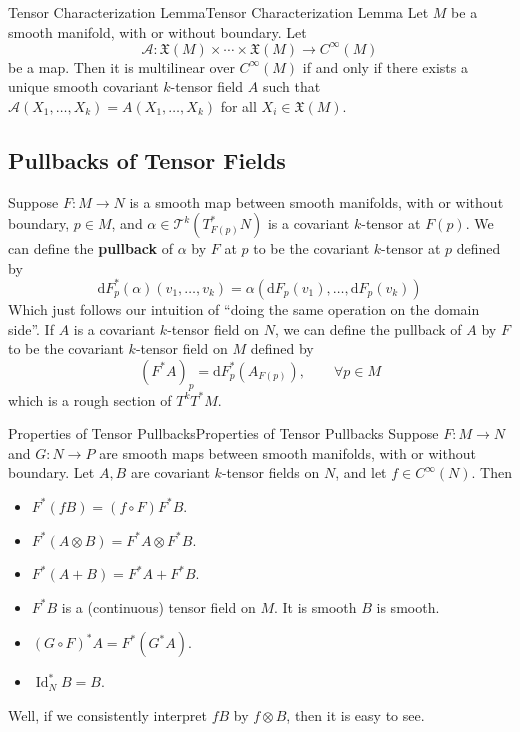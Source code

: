\documentclass[../main.tex]{subfiles}
\begin{document}
\begin{lemma}{Tensor Characterization Lemma}{Tensor Characterization Lemma}
  Let $M$ be a smooth manifold, with or without boundary. Let
  \begin{equation*}
    \mathcal{A}: \mathfrak{X}(M) \times \cdots \times \mathfrak{X}(M) \to C^\infty(M)
  \end{equation*}
  be a map. Then it is multilinear over $C^\infty(M)$ if and only if there exists a unique smooth covariant $k$-tensor field $A$ such that $\mathcal{A}(X_1, \ldots, X_k) = A(X_1, \ldots, X_k)$ for all $X_i \in \mathfrak{X}(M)$.
\end{lemma}

\subsection{Pullbacks of Tensor Fields}
Suppose $F: M \to N$ is a smooth map between smooth manifolds, with or without boundary, $p\in M$, and $\alpha\in \mathcal{T}^k(T^*_{F(p)} N)$ is a covariant $k$-tensor at $F(p)$. We can define the \textbf{pullback} of $\alpha$ by $F$ at $p$ to be the covariant $k$-tensor at $p$ defined by
\begin{equation}
  \mathrm{d} F_p^* (\alpha)(v_1, \ldots, v_k) = \alpha(\mathrm{d} F_p(v_1), \ldots, \mathrm{d} F_p(v_k))
\end{equation}
Which just follows our intuition of ``doing the same operation on the domain side''. If $A$ is a covariant $k$-tensor field on $N$, we can define the pullback of $A$ by $F$ to be the covariant $k$-tensor field on $M$ defined by
\begin{equation}
  (F^* A)_p = \mathrm{d} F_p^* (A_{F(p)}), \qquad \forall p\in M
\end{equation}
which is a rough section of $T^k T^* M$.

\begin{proposition}{Properties of Tensor Pullbacks}{Properties of Tensor Pullbacks}
  Suppose $F: M \to N$ and $G: N \to P$ are smooth maps between smooth manifolds, with or without boundary. Let $A, B$ are covariant $k$-tensor fields on $N$, and let $f\in C^\infty(N)$. Then
  \begin{itemize}
    \item $F^* (fB) = (f\circ F) F^* B$.
    \item $F^* (A \otimes B) = F^* A \otimes F^* B$.
    \item $F^* (A + B) = F^* A + F^* B$.
    \item $F^* B$ is a (continuous) tensor field on $M$. It is smooth $B$ is smooth.
    \item $(G \circ F)^* A = F^* (G^* A)$.
    \item $\operatorname{Id}_N^* B = B$.
  \end{itemize}
\end{proposition}
Well, if we consistently interpret $fB$ by $f \otimes B$, then it is easy to see.
\end{document}
